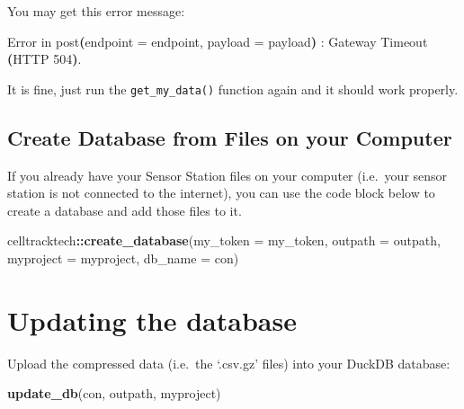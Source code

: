 \documentclass[
]{book}
\newenvironment{Shaded}{\begin{snugshade}}{\end{snugshade}}
\newcommand{\AttributeTok}[1]{\textcolor[rgb]{0.13,0.29,0.53}{#1}}
\newcommand{\BuiltInTok}[1]{#1}
\newcommand{\ErrorTok}[1]{\textcolor[rgb]{0.64,0.00,0.00}{\textbf{#1}}}
\newcommand{\ExtensionTok}[1]{#1}
\newcommand{\FunctionTok}[1]{\textcolor[rgb]{0.13,0.29,0.53}{\textbf{#1}}}
\newcommand{\KeywordTok}[1]{\textcolor[rgb]{0.13,0.29,0.53}{\textbf{#1}}}
\newcommand{\NormalTok}[1]{#1}
\newcommand{\SpecialCharTok}[1]{\textcolor[rgb]{0.81,0.36,0.00}{\textbf{#1}}}
\begin{document}
You may get this error message:

\begin{Shaded}
\begin{Highlighting}[]
\ExtensionTok{Error}\NormalTok{ in post}\ErrorTok{(}\ExtensionTok{endpoint}\NormalTok{ = endpoint, payload = payload}\KeywordTok{)} \BuiltInTok{:} 
  \ExtensionTok{Gateway}\NormalTok{ Timeout }\ErrorTok{(}\ExtensionTok{HTTP}\NormalTok{ 504}\KeywordTok{)}\BuiltInTok{.}
\end{Highlighting}
\end{Shaded}

It is fine, just run the \texttt{get\_my\_data()} function again and it should work properly.

\subsection{Create Database from Files on your Computer}\label{create-database-from-files-on-your-computer}

If you already have your Sensor Station files on your computer (i.e.~your sensor station is not connected to the internet), you can use the code block below to create a database and add those files to it.

\begin{Shaded}
\begin{Highlighting}[]
\NormalTok{celltracktech}\SpecialCharTok{::}\FunctionTok{create\_database}\NormalTok{(}\AttributeTok{my\_token =}\NormalTok{ my\_token,}
                               \AttributeTok{outpath =}\NormalTok{ outpath,}
                               \AttributeTok{myproject =}\NormalTok{ myproject,}
                               \AttributeTok{db\_name =}\NormalTok{ con)}
\end{Highlighting}
\end{Shaded}

\section{Updating the database}\label{updating-the-database}

Upload the compressed data (i.e.~the `.csv.gz' files) into your DuckDB database:

\begin{Shaded}
\begin{Highlighting}[]
\FunctionTok{update\_db}\NormalTok{(con, outpath, myproject)}
\end{Highlighting}
\end{Shaded}
\end{document}
